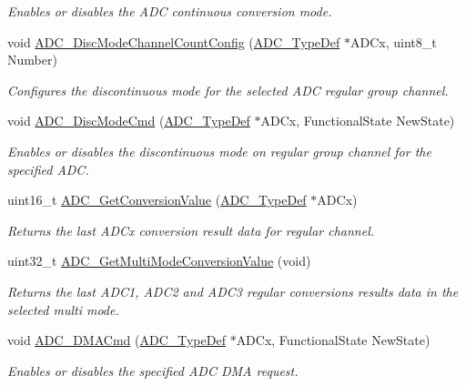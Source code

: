 \begin{DoxyCompactItemize}
\begin{DoxyCompactList}\small\item\em Enables or disables the A\+DC continuous conversion mode. \end{DoxyCompactList}\item 
void \hyperlink{group___a_d_c_ga6eb241ba82d67d1371136c9132083937}{A\+D\+C\+\_\+\+Disc\+Mode\+Channel\+Count\+Config} (\hyperlink{struct_a_d_c___type_def}{A\+D\+C\+\_\+\+Type\+Def} $\ast$A\+D\+Cx, uint8\+\_\+t Number)
\begin{DoxyCompactList}\small\item\em Configures the discontinuous mode for the selected A\+DC regular group channel. \end{DoxyCompactList}\item 
void \hyperlink{group___a_d_c_ga1909649d10253ce88d986ffbb94a4be6}{A\+D\+C\+\_\+\+Disc\+Mode\+Cmd} (\hyperlink{struct_a_d_c___type_def}{A\+D\+C\+\_\+\+Type\+Def} $\ast$A\+D\+Cx, Functional\+State New\+State)
\begin{DoxyCompactList}\small\item\em Enables or disables the discontinuous mode on regular group channel for the specified A\+DC. \end{DoxyCompactList}\item 
uint16\+\_\+t \hyperlink{group___a_d_c_gaaf74221c285ec5dab5e66baf7bec6bd3}{A\+D\+C\+\_\+\+Get\+Conversion\+Value} (\hyperlink{struct_a_d_c___type_def}{A\+D\+C\+\_\+\+Type\+Def} $\ast$A\+D\+Cx)
\begin{DoxyCompactList}\small\item\em Returns the last A\+D\+Cx conversion result data for regular channel. \end{DoxyCompactList}\item 
uint32\+\_\+t \hyperlink{group___a_d_c_ga989f4365b56be99999b8ec096aba2081}{A\+D\+C\+\_\+\+Get\+Multi\+Mode\+Conversion\+Value} (void)
\begin{DoxyCompactList}\small\item\em Returns the last A\+D\+C1, A\+D\+C2 and A\+D\+C3 regular conversions results data in the selected multi mode. \end{DoxyCompactList}\item 
void \hyperlink{group___a_d_c_gac5881d5995818001584b27b137a8dbcb}{A\+D\+C\+\_\+\+D\+M\+A\+Cmd} (\hyperlink{struct_a_d_c___type_def}{A\+D\+C\+\_\+\+Type\+Def} $\ast$A\+D\+Cx, Functional\+State New\+State)
\begin{DoxyCompactList}\small\item\em Enables or disables the specified A\+DC D\+MA request. \end{DoxyCompactList}\item 

\end{DoxyCompactItemize}
